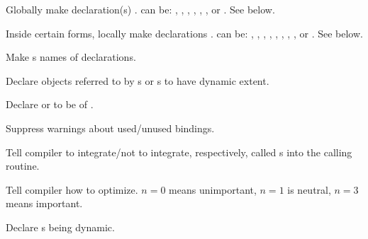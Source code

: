 \begin{LIST}{1cm}

  {
  Globally make declaration(s) .  can be:
  ,      
  ,
  ,           
  ,   
  ,
  , or
  .
  See below.
  }

  {
  Inside certain forms, locally make declarations .  can be:
  ,
  ,
  ,           
  ,       
  ,     
  ,     
  ,  
  , or
  .
  See below.      
  }

  \begin{LIST}{.5cm}
    
    {
    Make s names of declarations.
   }
 
    {
    Declare objects referred to by s or s to have
    dynamic extent. 
  }


    {
    Declare  or  to be of .
  }

    {
    Suppress warnings about used/unused bindings.
  }

    {
    Tell compiler to integrate/not to integrate, respectively, called
    s into the calling routine.
  }

    {
    Tell compiler how to optimize. $n=0$ means unimportant, $n=1$ is
    neutral, $n=3$ means important.
  }

    {
    Declare s being dynamic.
  }

  \end{LIST}
\end{LIST}




